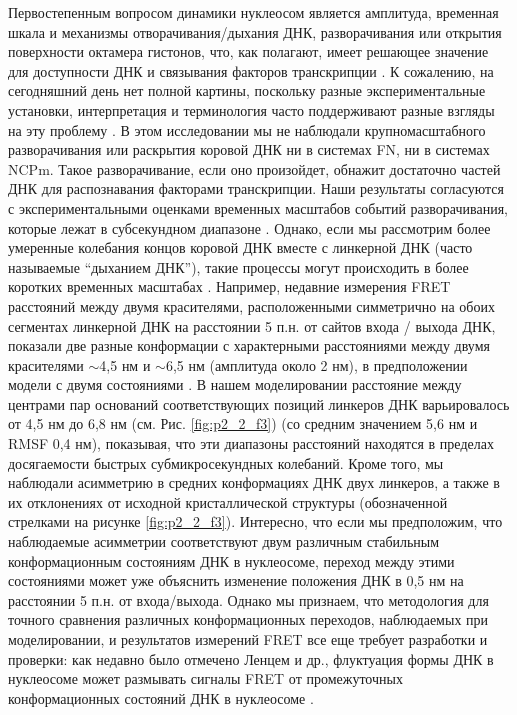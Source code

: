     Первостепенным вопросом динамики нуклеосом является амплитуда, временная шкала и механизмы отворачивания/дыхания ДНК, разворачивания или открытия поверхности октамера гистонов, что, как полагают, имеет решающее значение для доступности ДНК и связывания факторов транскрипции \cite{li_rapid_2005,mirny_nucleosome-mediated_2010}. К сожалению, на сегодняшний день нет полной картины, поскольку разные экспериментальные установки, интерпретация и терминология часто поддерживают разные взгляды на эту проблему \cite{choy_structural_2012,zlatanova_nucleosome_2009}. В этом исследовании мы не наблюдали крупномасштабного разворачивания или раскрытия коровой ДНК ни в системах FN, ни в системах NCPm. Такое разворачивание, если оно произойдет, обнажит достаточно частей ДНК для распознавания факторами транскрипции. Наши результаты согласуются с экспериментальными оценками временных масштабов событий разворачивания, которые лежат в субсекундном диапазоне \cite{li_rapid_2005,tomschik_nucleosome_2009}. Однако, если мы рассмотрим более умеренные колебания концов коровой ДНК вместе с линкерной ДНК (часто называемые ``дыханием ДНК''), такие процессы могут происходить в более коротких временных масштабах \cite{gansen_nucleosome_2009}. Например, недавние измерения FRET расстояний между двумя красителями, расположенными симметрично на обоих сегментах линкерной ДНК на расстоянии 5 п.н. от сайтов входа / выхода ДНК, показали две разные конформации с характерными расстояниями между двумя красителями $\sim$4,5 нм и $\sim$6,5 нм (амплитуда около 2 нм), в предположении  модели с двумя состояниями \cite{nurse_clipping_2013}. В нашем моделировании расстояние между центрами пар оснований соответствующих позиций линкеров ДНК варьировалось от 4,5 нм до 6,8 нм (см. Рис. \ref{fig:p2_2_f3}) (со средним значением 5,6 нм и RMSF 0,4 нм), показывая, что эти диапазоны расстояний находятся в пределах досягаемости быстрых субмикросекундных колебаний. Кроме того, мы наблюдали асимметрию в средних конформациях ДНК двух линкеров, а также в их отклонениях от исходной кристаллической структуры (обозначенной стрелками на рисунке \ref{fig:p2_2_f3}). Интересно, что если мы предположим, что наблюдаемые асимметрии соответствуют двум различным стабильным конформационным состояниям ДНК в нуклеосоме, переход между этими состояниями может уже объяснить изменение положения ДНК в  0,5 нм на расстоянии 5 п.н. от входа/выхода. Однако мы признаем, что методология для точного сравнения различных конформационных переходов, наблюдаемых при моделировании, и результатов измерений FRET все еще требует разработки и проверки: как недавно было отмечено Ленцем и др., флуктуация формы ДНК в нуклеосоме может размывать сигналы FRET от промежуточных конформационных состояний ДНК в нуклеосоме \cite{lenz_influence_2015}.

